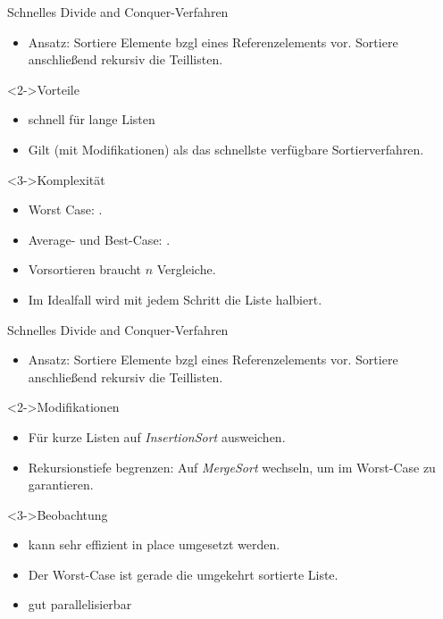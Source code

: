 \begin{frame}
    \begin{block}{Schnelles \alert{Divide and Conquer}-Verfahren}
        \begin{itemize}
            \item Ansatz: Sortiere Elemente bzgl eines Referenzelements vor. Sortiere anschließend rekursiv die Teillisten.
        \end{itemize}
    \end{block}
    \begin{block}<2->{Vorteile}
        \begin{itemize}
            \item schnell für lange Listen
            \item Gilt (mit Modifikationen) als das schnellste verfügbare Sortierverfahren.
        \end{itemize}
    \end{block}
    \begin{block}<3->{Komplexität}
        \begin{itemize}
            \item Worst Case: \alert{\osquare}.
            \item Average- und Best-Case: \alert{\onlog}.
            \item Vorsortieren braucht $n$ Vergleiche.
            \item Im Idealfall wird mit jedem Schritt die Liste halbiert.
        \end{itemize}
    \end{block}
\end{frame}

\begin{frame}
    \begin{block}{Schnelles \alert{Divide and Conquer}-Verfahren}
        \begin{itemize}
            \item Ansatz: Sortiere Elemente bzgl eines Referenzelements vor. Sortiere anschließend rekursiv die Teillisten.
        \end{itemize}
    \end{block}
    \begin{block}<2->{Modifikationen}
        \begin{itemize}
            \item Für kurze Listen auf \emph{InsertionSort} ausweichen.
            \item Rekursionstiefe begrenzen: Auf \emph{MergeSort} wechseln, um \onlog im Worst-Case zu garantieren.
        \end{itemize}
    \end{block}
    \begin{block}<3->{Beobachtung}
        \begin{itemize}
            \item kann sehr effizient \alert{in place} umgesetzt werden.
            \item Der Worst-Case ist gerade die umgekehrt sortierte Liste.
            \item gut parallelisierbar
        \end{itemize}
    \end{block}
\end{frame}
